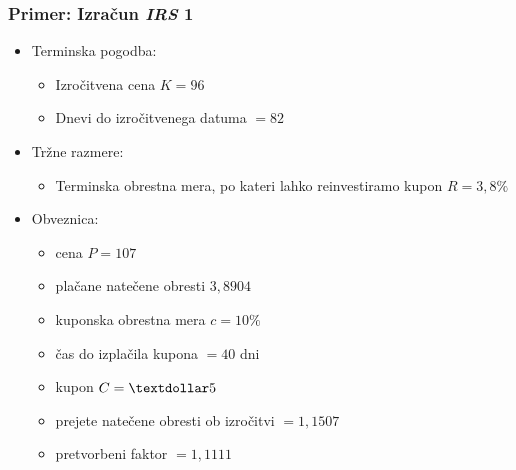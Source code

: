 \documentclass[14pt]{beamer}
\begin{document}
\begin{frame}
    \frametitle{Primer: Izračun \textit{IRS} 1}
    
    \begin{itemize}
        \item Terminska pogodba: 
        
                \begin{itemize}
                    \item Izročitvena cena $K = 96$
                    \item Dnevi do izročitvenega datuma $= 82$
                \end{itemize}

        \item Tržne razmere:
        
                \begin{itemize}
                    \item Terminska obrestna mera, po kateri lahko reinvestiramo
                            kupon $R = 3,8\%$
                \end{itemize}

        \item Obveznica:
        
                \begin{itemize}
                    \item cena $P = 107$
                    \item plačane natečene obresti $3,8904$
                    \item kuponska obrestna mera $c = 10\%$
                    \item čas do izplačila kupona $ = 40$ dni
                    \item kupon $C = \textdollar5$
                    \item prejete natečene obresti ob izročitvi $ = 1,1507$
                    \item pretvorbeni faktor $ = 1,1111$
                \end{itemize}

    \end{itemize}

    \note[item]{}

\end{frame}
\end{document}
